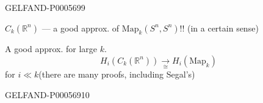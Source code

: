 \begin{GelfandAdjacentEvidence}{GELFAND-P000569}{9}

\(C_k(\mathbb R^n)\) — a good approx. of \(\mathrm{Map}_k(S^n,S^n)\)!! (in a certain sense)

A good approx. for large \(k\).
\[
H_i(C_k(\mathbb R^n))\underset{\cong}{\longrightarrow}H_i(\mathrm{Map}_k)
\]
\hfill for \(i\ll k\)\qquad (there are many proofs, including Segal’s)\par
{}
\end{GelfandAdjacentEvidence}
\begin{GelfandAdjacentEvidence}{GELFAND-P000569}{10}

\end{GelfandAdjacentEvidence}



